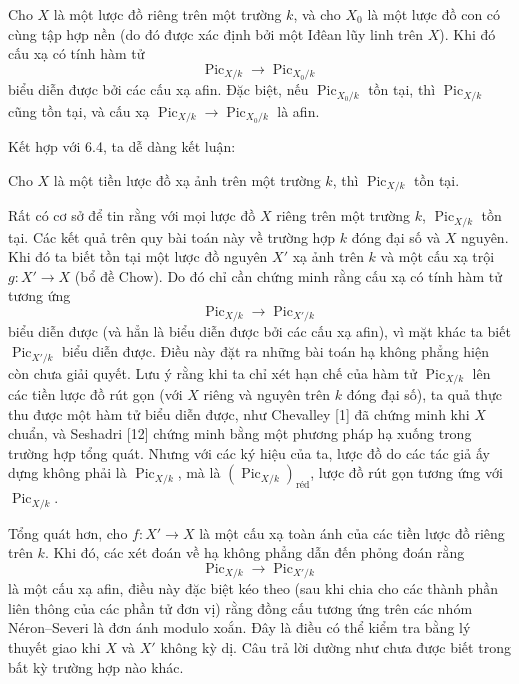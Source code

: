  Cho $X$ là một lược đồ riêng trên một trường $k$, và cho
$X_0$ là một lược đồ con có cùng tập hợp nền (do đó được xác định bởi một Iđêan
lũy linh trên $X$). Khi đó cấu xạ có tính hàm tử
\[
\operatorname{Pic}_{X/k}\longrightarrow\operatorname{Pic}_{X_0/k}
\]
biểu diễn được bởi các cấu xạ afin. Đặc biệt, nếu
$\operatorname{Pic}_{X_0/k}$ tồn tại, thì $\operatorname{Pic}_{X/k}$ cũng tồn
tại, và cấu xạ
$\operatorname{Pic}_{X/k}\longrightarrow\operatorname{Pic}_{X_0/k}$ là afin.

Kết hợp với 6.4, ta dễ dàng kết luận:

 Cho $X$ là một tiền lược đồ xạ ảnh trên một trường $k$,
thì $\operatorname{Pic}_{X/k}$ tồn tại.

 Rất có cơ sở để tin rằng với mọi lược đồ $X$ riêng trên
một trường $k$, $\operatorname{Pic}_{X/k}$ tồn tại. Các kết quả trên
quy bài toán này về trường hợp $k$ đóng đại số và $X$ nguyên. Khi đó ta biết
tồn tại một lược đồ nguyên $X'$ xạ ảnh trên $k$ và một cấu xạ trội
$g:X'\longrightarrow X$ (bổ đề Chow). Do đó chỉ cần chứng minh rằng
cấu xạ có tính hàm tử tương ứng
\[
\operatorname{Pic}_{X/k}\longrightarrow\operatorname{Pic}_{X'/k}
\]
biểu diễn được (và hẳn là biểu diễn được bởi các cấu xạ afin), vì mặt khác ta
biết $\operatorname{Pic}_{X'/k}$ biểu diễn được. Điều này đặt ra những bài toán
hạ không phẳng hiện còn chưa giải quyết. Lưu ý rằng khi ta chỉ xét hạn chế của
hàm tử $\operatorname{Pic}_{X/k}$ lên các tiền lược đồ rút gọn (với $X$ riêng
và nguyên trên $k$ đóng đại số), ta quả thực thu được một hàm tử biểu diễn
được, như Chevalley [1] đã chứng minh khi $X$ chuẩn, và Seshadri [12] chứng minh
bằng một phương pháp hạ xuống trong trường hợp tổng quát. Nhưng với các ký hiệu
của ta, lược đồ do các tác giả ấy dựng không phải là
$\operatorname{Pic}_{X/k}$, mà là
$(\operatorname{Pic}_{X/k})_{\mathrm{réd}}$, lược đồ rút gọn tương ứng với
$\operatorname{Pic}_{X/k}$.

 Tổng quát hơn, cho $f:X'\longrightarrow X$ là một cấu
xạ toàn ánh của các tiền lược đồ riêng trên $k$. Khi đó, các xét đoán về hạ
không phẳng dẫn đến phỏng đoán rằng
\[
\operatorname{Pic}_{X/k}\longrightarrow\operatorname{Pic}_{X'/k}
\]
là một cấu xạ afin, điều này đặc biệt kéo theo (sau khi chia cho các thành phần liên
thông của các phần tử đơn vị) rằng đồng cấu tương ứng trên các nhóm
Néron--Severi là đơn ánh modulo xoắn. Đây là điều có thể kiểm tra bằng lý thuyết
giao khi $X$ và $X'$ không kỳ dị. Câu trả lời dường như chưa được biết trong
bất kỳ trường hợp nào khác.

